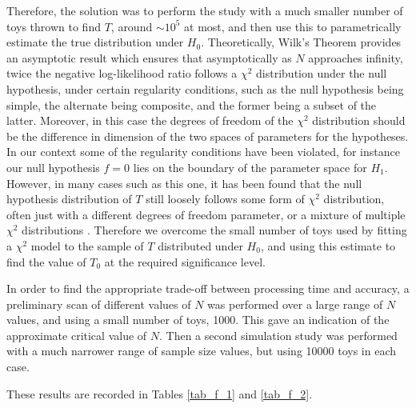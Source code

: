 \documentclass[12pt]{article}
\begin{document}
Therefore, the solution was to perform the study with a much smaller number of toys thrown to find $T$, around $\sim10^5$ at most, and then use this to parametrically estimate the true distribution under $H_0$.
Theoretically, Wilk's Theorem \cite{wilks} provides an asymptotic result which ensures that asymptotically as $N$ approaches infinity, twice the negative log-likelihood ratio follows a $\chi^2$ distribution under the null hypothesis, under certain regularity conditions, such as the null hypothesis being simple, the alternate being composite, and the former being a subset of the latter.
Moreover, in this case the degrees of freedom of the $\chi^2$ distribution should be the difference in dimension of the two spaces of parameters for the hypotheses.
In our context some of the regularity conditions have been violated, for instance our null hypothesis $f=0$ lies on the boundary of the parameter space for $H_1$.
However, in many cases such as this one, it has been found that the null hypothesis distribution of $T$ still loosely follows some form of $\chi^2$ distribution, often just with a different degrees of freedom parameter, or a mixture of multiple $\chi^2$ distributions \cite{wilks_exc_1} \cite{wilks_exc_2}.
Therefore we overcome the small number of toys used by fitting a $\chi^2$ model to the sample of $T$ distributed under $H_0$, and using this estimate to find the value of $T_0$ at the required significance level.

In order to find the appropriate trade-off between processing time and accuracy, a preliminary scan of different values of $N$ was performed over a large range of $N$ values, and using a small number of toys, 1000.
This gave an indication of the approximate critical value of $N$.
Then a second simulation study was performed with a much narrower range of sample size values, but using 10000 toys in each case.

These results are recorded in Tables \ref{tab_f_1} and \ref{tab_f_2}.
\end{document}
